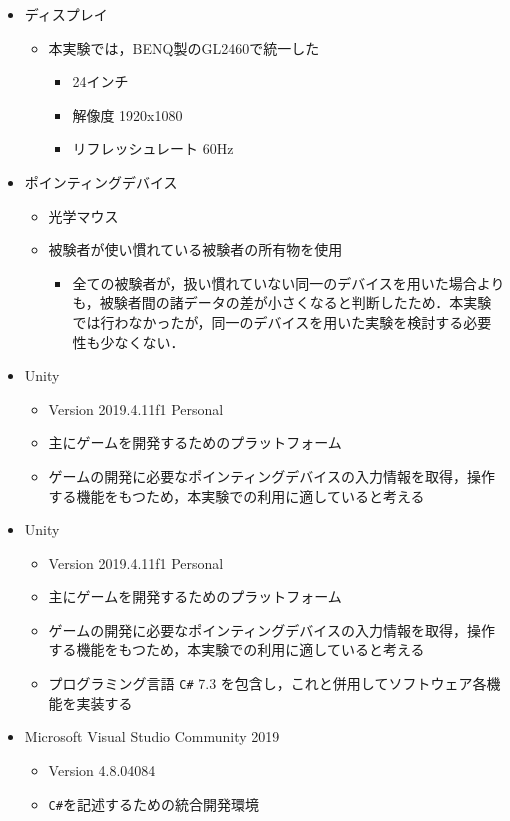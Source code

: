 \documentclass[a4paper, papersize, titlepage]{jsarticle}
\begin{document}
\begin{multicols}{2}
\begin{itemize}
\item ディスプレイ
\begin{itemize}
\item 本実験では，BENQ製のGL2460で統一した
\begin{itemize}
\item 24インチ
\item 解像度 1920x1080
\item リフレッシュレート 60Hz
\end{itemize}
\end{itemize}

\item ポインティングデバイス
\begin{itemize}
\item 光学マウス
\item 被験者が使い慣れている被験者の所有物を使用
\begin{itemize}
\item 全ての被験者が，扱い慣れていない同一のデバイスを用いた場合よりも，被験者間の諸データの差が小さくなると判断したため．本実験では行わなかったが，同一のデバイスを用いた実験を検討する必要性も少なくない．
\end{itemize}
\end{itemize}

\item Unity
\begin{itemize}
\item Version 2019.4.11f1 Personal
\item 主にゲームを開発するためのプラットフォーム~\cite{unity_bib}
\item ゲームの開発に必要なポインティングデバイスの入力情報を取得，操作する機能をもつため，本実験での利用に適していると考える
\end{itemize}

\item Unity
\begin{itemize}
\item Version 2019.4.11f1 Personal
\item 主にゲームを開発するためのプラットフォーム~\cite{unity_bib}
\item ゲームの開発に必要なポインティングデバイスの入力情報を取得，操作する機能をもつため，本実験での利用に適していると考える
\item プログラミング言語 \verb|C#| 7.3 を包含し，これと併用してソフトウェア各機能を実装する
\end{itemize}

\item Microsoft Visual Studio Community 2019
\begin{itemize}
\item Version 4.8.04084
\item \verb|C#|を記述するための統合開発環境
\end{itemize}


\end{itemize}
\end{multicols}
\end{document}
